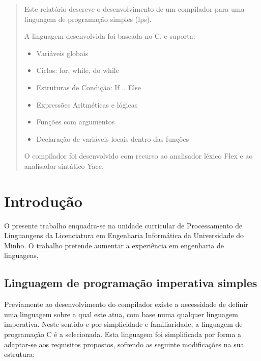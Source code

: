 \documentclass[a4paper,10pt]{report}
\begin{document}


\begin{abstract}
Este relatório descreve o desenvolvimento de um compilador para uma linguagem de programação simples (lps). 

A linguagem desenvolvida foi baseada no C, e suporta:
\begin{itemize}
  \item Variáveis globais
  \item Ciclos: for, while, do while
  \item Estruturas de Condição: If .. Else
  \item Expressões Aritméticas e lógicas
  \item Funções com argumentos
  \item Declaração de variáveis locais dentro das funções
\end{itemize}
O compilador foi desenvolvido com recurso ao analisador léxico Flex e ao analisador sintático Yacc.

\end{abstract}
\tableofcontents
\thispagestyle{empty} %

\chapter{Introdução}
\label{cap:intro}
O presente trabalho enquadra-se na unidade curricular de Processamento de Linguangens da Licenciatura em Engenharia Informática da Universidade do Minho. O trabalho pretende aumentar a experiência em engenharia de linguagens, 

\section{Linguagem de programação imperativa simples}
    Previamente ao desenvolvimento do compilador existe a necessidade de definir uma linguagem sobre a qual este atua, com base numa qualquer linguagem imperativa. Neste sentido e por simplicidade e familiaridade, a linguagem de programação C é a selecionada. Esta linguagem foi simplificada por forma a adaptar-se aos requisitos propostos, sofrendo as seguinte modificações na sua estrutura:
\end{document}
